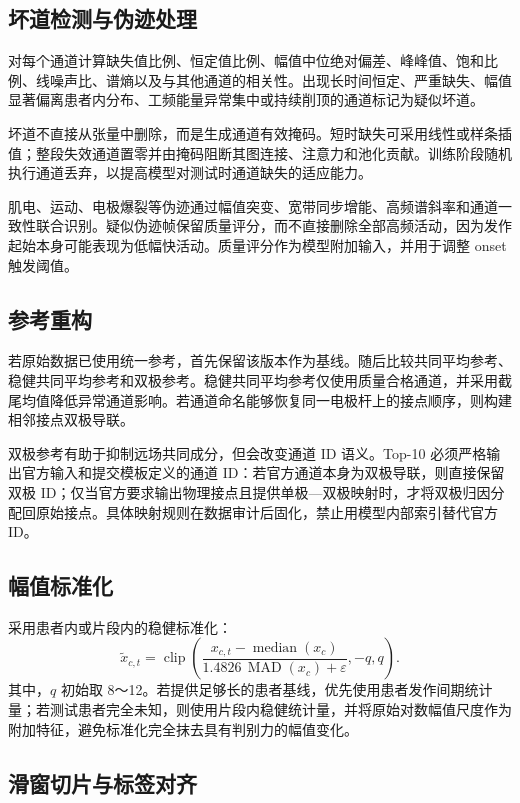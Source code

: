 \documentclass{cumcmthesis}
\numberwithin{figure}{section} %
\numberwithin{table}{section} %
\begin{document}
\subsection{坏道检测与伪迹处理}
对每个通道计算缺失值比例、恒定值比例、幅值中位绝对偏差、峰峰值、饱和比例、线噪声比、谱熵以及与其他通道的相关性。出现长时间恒定、严重缺失、幅值显著偏离患者内分布、工频能量异常集中或持续削顶的通道标记为疑似坏道。

坏道不直接从张量中删除，而是生成通道有效掩码。短时缺失可采用线性或样条插值；整段失效通道置零并由掩码阻断其图连接、注意力和池化贡献。训练阶段随机执行通道丢弃，以提高模型对测试时通道缺失的适应能力。

肌电、运动、电极爆裂等伪迹通过幅值突变、宽带同步增能、高频谱斜率和通道一致性联合识别。疑似伪迹帧保留质量评分，而不直接删除全部高频活动，因为发作起始本身可能表现为低幅快活动。质量评分作为模型附加输入，并用于调整 onset 触发阈值。

\subsection{参考重构}
若原始数据已使用统一参考，首先保留该版本作为基线。随后比较共同平均参考、稳健共同平均参考和双极参考。稳健共同平均参考仅使用质量合格通道，并采用截尾均值降低异常通道影响。若通道命名能够恢复同一电极杆上的接点顺序，则构建相邻接点双极导联。

双极参考有助于抑制远场共同成分，但会改变通道 ID 语义。Top-10 必须严格输出官方输入和提交模板定义的通道 ID：若官方通道本身为双极导联，则直接保留双极 ID；仅当官方要求输出物理接点且提供单极—双极映射时，才将双极归因分配回原始接点。具体映射规则在数据审计后固化，禁止用模型内部索引替代官方 ID。

\subsection{幅值标准化}
采用患者内或片段内的稳健标准化：
\begin{equation*}
\tilde{x}_{c,t}
=
\operatorname{clip}\left(
\frac{
    x_{c,t}-\operatorname{median}(x_c)
}{
    1.4826\,\operatorname{MAD}(x_c)+\varepsilon
},
-q,q
\right).
\end{equation*}
其中，$q$ 初始取 8～12。若提供足够长的患者基线，优先使用患者发作间期统计量；若测试患者完全未知，则使用片段内稳健统计量，并将原始对数幅值尺度作为附加特征，避免标准化完全抹去具有判别力的幅值变化。

\subsection{滑窗切片与标签对齐}
\end{document}
